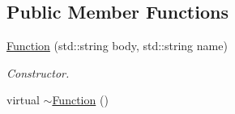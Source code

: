 \subsection*{Public Member Functions}
\begin{DoxyCompactItemize}
\item 
\hyperlink{class_function_a508de932e951e7149bf67a71add8b767}{Function} (std\-::string body, std\-::string name)
\begin{DoxyCompactList}\small\item\em Constructor. \end{DoxyCompactList}\item 
\hypertarget{class_function_a3b03f7cf0b75d16edebdda1dee1db6fd}{virtual \hyperlink{class_function_a3b03f7cf0b75d16edebdda1dee1db6fd}{$\sim$\-Function} ()}\label{class_function_a3b03f7cf0b75d16edebdda1dee1db6fd}


\end{DoxyCompactItemize}
